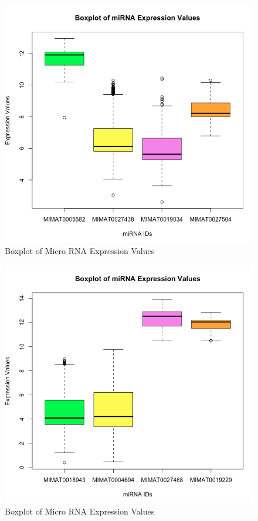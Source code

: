 \documentclass{bioinfo}
\begin{document}
\begin{methods}
\begin{figure}[htbp]
\centering
\includegraphics[scale=0.40]{Boxplot3.png}
\caption{Boxplot of Micro RNA Expression Values}
\label{fig:Boxplot3}
\end{figure}

\begin{figure}[htbp]
\centering
\includegraphics[scale=0.40]{Boxplot4.png}
\caption{Boxplot of Micro RNA Expression Values}
\label{fig:Boxplot4}
\end{figure}



\end{methods}
\end{document}
